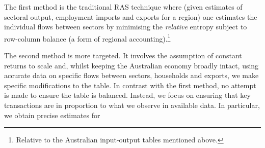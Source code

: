 \documentclass[12pt,a4paper]{article}
\begin{document}
The first method is the traditional RAS technique where (given estimates of
sectoral output, employment imports and exports for a region) one estimates the
individual flows between sectors by minimising the \emph{relative} entropy
subject to row-column balance (a form of regional accounting).\footnote{
  Relative to the Australian input-output tables mentioned above.  }


The second method is more targeted. It involves the assumption of constant
returns to scale and, whilst keeping the Australian economy broadly intact,
using accurate data on specific flows between sectors, households and exports,
we make specific modifications to the table. In contrast with the first method,
no attempt is made to ensure the table is balanced. 
%
%
%    
%
%
%
%
%
%
%
Instead, we focus on ensuring that key transactions are in proportion to what
we observe in available data. In particular, we obtain precise estimates for
\end{document}
